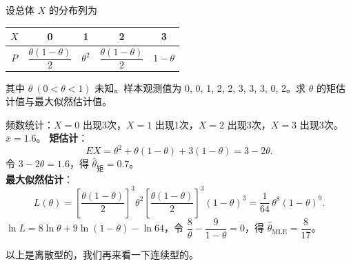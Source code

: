 ﻿\documentclass[lang=cn,11pt]{elegantbook}
\begin{document}
\begin{exercise}\label{exer:7-discrete-0123}
设总体 \(X\) 的分布列为
\begin{center}
\begin{tabular}{c|cccc}
\(X\) & 0 & 1 & 2 & 3 \\
\hline
\(P\) & \(\dfrac{\theta(1-\theta)}{2}\) & \(\theta^2\) & \(\dfrac{\theta(1-\theta)}{2}\) & \(1-\theta\)
\end{tabular}
\end{center}
其中 \(\theta\ (0 < \theta < 1)\) 未知。样本观测值为 0, 0, 1, 2, 2, 3, 3, 3, 0, 2。求 \(\theta\) 的矩估计值与最大似然估计值。
\end{exercise}
\begin{solution}
频数统计：\(X=0\) 出现3次，\(X=1\) 出现1次，\(X=2\) 出现3次，\(X=3\) 出现3次。\(\overline{x} = 1.6\)。
\textbf{矩估计}：
\[
EX = \theta^2 + \theta(1-\theta) + 3(1-\theta) = 3-2\theta.
\]
令 \(3-2\theta = 1.6\)，得 \(\hat{\theta}_{\text{矩}} = 0.7\)。\\
\textbf{最大似然估计}：
\[
L(\theta) = \left[\frac{\theta(1-\theta)}{2}\right]^{\!3}\theta^2\!\left[\frac{\theta(1-\theta)}{2}\right]^{\!3}(1-\theta)^3 = \frac{1}{64}\,\theta^8(1-\theta)^9.
\]
\(\ln L = 8\ln\theta + 9\ln(1-\theta) - \ln 64\)，令 \(\dfrac{8}{\theta} - \dfrac{9}{1-\theta} = 0\)，得 \(\hat{\theta}_{\text{MLE}} = \dfrac{8}{17}\)。
\end{solution}

\begin{remark}
以上是离散型的，我们再来看一下连续型的。
\end{remark}
\end{document}
